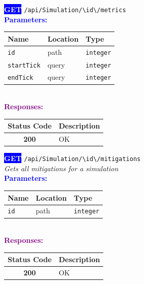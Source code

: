 \begin{tcolorbox}[
    colback=blue!5,
    colframe=blue,
    arc=2mm,
    boxrule=1pt,
    left=5pt,
    right=5pt,
    top=5pt,
    bottom=5pt
]
\noindent\colorbox{blue}{\textcolor{white}{\textbf{GET}}} 
\texttt{\large /api/Simulation/\textbackslash{}{id\textbackslash{}}/metrics}\\[0.3em]
\vspace{0.3em}
\textbf{\textcolor{blue}{Parameters:}}\\[0.2em]
\begin{tabular}{|l|l|l|}
\hline
\rowcolor{gray!20}
\textbf{Name} & \textbf{Location} & \textbf{Type} \\ \hline
\texttt{id} & path & \texttt{integer} \\ \hline
\rowcolor{gray!5}
\texttt{startTick} & query & \texttt{integer} \\ \hline
\texttt{endTick} & query & \texttt{integer} \\ \hline
\end{tabular}\\[0.5em]
\vspace{0.3em}
\textbf{\textcolor{purple}{Responses:}}\\[0.2em]
\begin{tabular}{|c|p{10cm}|}
\hline
\rowcolor{gray!20}
\textbf{Status Code} & \textbf{Description} \\ \hline
\colorbox{green!20}{\textbf{200}} & OK \\ \hline
\end{tabular}
\end{tcolorbox}
\vspace{0.5em}

\begin{tcolorbox}[
    colback=blue!5,
    colframe=blue,
    arc=2mm,
    boxrule=1pt,
    left=5pt,
    right=5pt,
    top=5pt,
    bottom=5pt
]
\noindent\colorbox{blue}{\textcolor{white}{\textbf{GET}}} 
\texttt{\large /api/Simulation/\textbackslash{}{id\textbackslash{}}/mitigations}\\[0.3em]
\textit{Gets all mitigations for a simulation}\\[0.3em]
\vspace{0.3em}
\textbf{\textcolor{blue}{Parameters:}}\\[0.2em]
\begin{tabular}{|l|l|l|}
\hline
\rowcolor{gray!20}
\textbf{Name} & \textbf{Location} & \textbf{Type} \\ \hline
\texttt{id} & path & \texttt{integer} \\ \hline
\end{tabular}\\[0.5em]
\vspace{0.3em}
\textbf{\textcolor{purple}{Responses:}}\\[0.2em]
\begin{tabular}{|c|p{10cm}|}
\hline
\rowcolor{gray!20}
\textbf{Status Code} & \textbf{Description} \\ \hline
\colorbox{green!20}{\textbf{200}} & OK \\ \hline
\end{tabular}
\end{tcolorbox}
\vspace{0.5em}


